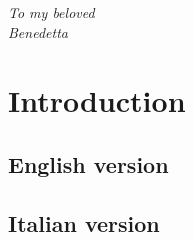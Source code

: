 \documentclass[11pt,a4paper,openright,twoside]{report}
\theoremstyle{plain}
\theoremstyle{definition}
\begin{document}

\begin{titlepage}
\thispagestyle{empty}                   
\topmargin=6.5cm                        
\raggedleft                             
\large 
                                 
                                       
\em                                     
To my beloved\\
Benedetta                   
\newpage                                

\clearpage{\pagestyle{empty}\cleardoublepage}
\end{titlepage}


            










































\chapter*{Introduction}   



\section*{English version}



\section*{Italian version}
\end{document}

